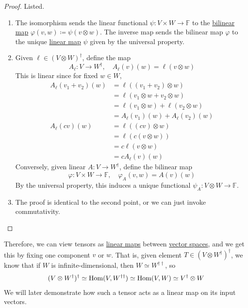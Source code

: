 	\begin{proof}
		Listed. 
		\begin{enumerate}
		  \item The isomorphism sends the linear functional $\psi: V \times W \to \mathbb{F}$ to the \hyperref[def:bilinear-map]{bilinear map} $\varphi(v, w) \coloneqq \psi(v \otimes w)$. The inverse map sends the bilinear map $\varphi$ to the unique \hyperref[def:linear_map]{linear map} $\psi$ given by the universal property. 

			\item Given $\ell \in (V \otimes W)^\dagger$, define the map 
				\begin{equation}
				  A_\ell: V \to W^\dagger, \quad A_\ell (v) (w) = \ell(v \otimes w)
				\end{equation}
				This is linear since for fixed $w \in W$, 
				\begin{align}
					A_\ell (v_1 + v_2) (w) & = \ell ( (v_1 + v_2) \otimes w) \\ 
																 & = \ell (v_1 \otimes w + v_2 \otimes w) \\ 
																 & = \ell(v_1 \otimes w) + \ell(v_2 \otimes w) \\ 
																 & = A_\ell (v_1) (w) + A_\ell (v_2)(w) \\ 
					A_\ell (cv)(w) & = \ell ((cv) \otimes w) \\ 
												 & = \ell (c (v \otimes w)) \\ 
												 & = c \ell (v \otimes w) \\ 
												 & = c A_\ell (v) (w)
				\end{align}
				Conversely, given linear $A: V \to W^\dagger$, define the bilinear map 
				\begin{equation}
					\varphi: V \times W \to \mathbb{F}, \quad \varphi_A (v, w) = A(v)(w)
				\end{equation}
				By the universal property, this induces a unique functional $\psi_A: V \otimes W \to \mathbb{F}$. 

			\item The proof is identical to the second point, or we can just invoke commutativity. 
		\end{enumerate}
	\end{proof}

	Therefore, we can view tensors as \hyperref[def:linear_map]{linear maps} between \hyperref[def:vector-space]{vector spaces}, and we get this by fixing one component $v$ or $w$. That is, given element $T \in (V \otimes W^\dagger)^\dagger$, we know that if $W$ is infinite-dimensional, then $W \simeq W^{\dagger\dagger}$, so 
	\begin{equation}
		(V \otimes W^\dagger)^\dagger \simeq \operatorname{Hom}(V, W^{\dagger\dagger}) \simeq \operatorname{Hom}(V, W) \simeq V^\dagger \otimes W
	\end{equation}
	We will later demonstrate how such a tensor acts as a linear map on its input vectors. 

